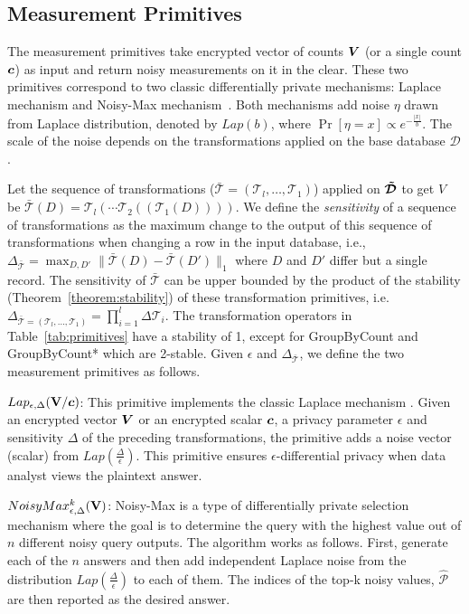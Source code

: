 \subsection{Measurement Primitives} \label{sec:measurement_primitives}
The measurement primitives take encrypted vector of counts $\boldsymbol{V}$ (or a single count $\boldsymbol{c}$) as input and return noisy measurements on it in the clear. These two primitives correspond to two classic differentially private mechanisms: Laplace mechanism and Noisy-Max mechanism~\cite{Dork}. Both mechanisms add noise $\eta$ drawn from Laplace distribution, denoted by $Lap(b)$, where $\Pr[\eta =x]\propto e^{-{\frac{|x|}{b}}}$. The scale of the noise depends on the transformations applied on the base database $\mathcal{D}$. 

Let the sequence of transformations ($\bar{\mathcal{T}}=(\mathcal{T}_l,\ldots,\mathcal{T}_1)$) applied on $\boldsymbol{\tilde{\mathcal{D}}}$ to get $V$ be $\bar{\mathcal{T}}(D) = \mathcal{T}_l(\cdots \mathcal{T}_2((\mathcal{T}_1(D))))$. We define the \emph{sensitivity} of a sequence of transformations as  the maximum change to the output of this sequence of transformations when changing a row in the input database, i.e., $\Delta_{\bar{\mathcal{T}}} = \max_{D,D'} \|\bar{\mathcal{T}}(D)-\bar{\mathcal{T}}(D')\|_1$ where $D$ and $D'$ differ but a single record. The sensitivity of $\bar{\mathcal{T}}$ can be upper bounded by the product of the stability (Theorem~\ref{theorem:stability}) of these transformation primitives, i.e. $\Delta_{\bar{\mathcal{T}}=(\mathcal{T}_l,\ldots,\mathcal{T}_1)} = \prod_{i=1}^l \Delta \mathcal{T}_i$. The transformation operators in Table~\ref{tab:primitives} have a stability of 1, except for \textsf{GroupByCount} and \textsf{GroupByCount*} which are 2-stable. Given $\epsilon$ and $\Delta_{\bar{\mathcal{T}}}$, we define the two measurement primitives as follows.


 $Lap_{\epsilon,\Delta}(\mathbf{V}/\boldsymbol{c})$:  This primitive implements the classic Laplace mechanism \cite{Dork}. Given an encrypted vector $\boldsymbol{V}$ or an encrypted scalar $\boldsymbol{c}$, a privacy parameter $\epsilon$ and sensitivity $\Delta$ of the preceding transformations, the primitive adds a noise vector (scalar) from $Lap(\frac{\Delta}{\epsilon})$. This primitive ensures $\epsilon$-differential privacy when data analyst views the plaintext answer.

 $NoisyMax_{\epsilon,\Delta}^k(\mathbf{V})$:  Noisy-Max is a type of differentially private selection mechanism \cite{Dork} where the goal is to determine the query with the highest value out of $n$ different noisy query outputs. The algorithm works as follows. First, generate each of the $n$ answers and then add independent Laplace noise from the distribution $Lap(\frac{\Delta}{\epsilon})$ to each of them. The indices of the top-k noisy values, $\hat{\mathcal{P}}$ are then reported as the desired answer. 

